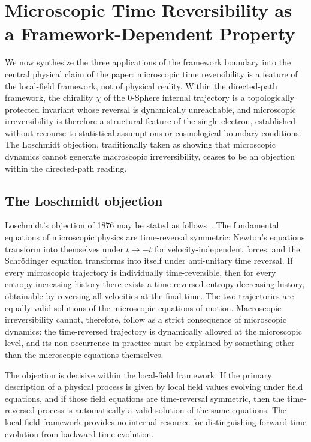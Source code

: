 \documentclass[%
 reprint, amsmath,amssymb, aps, prb, ]{revtex4-2}
\numberwithin{equation}{section}
\begin{document}
\section{Microscopic Time Reversibility as a Framework-Dependent Property}
\label{sec:irreversibility}

We now synthesize the three applications of the framework boundary into the central physical claim of the paper: microscopic time reversibility is a feature of the local-field framework, not of physical reality. Within the directed-path framework, the chirality $\chi$ of the 0-Sphere internal trajectory is a topologically protected invariant whose reversal is dynamically unreachable, and microscopic irreversibility is therefore a structural feature of the single electron, established without recourse to statistical assumptions or cosmological boundary conditions. The Loschmidt objection, traditionally taken as showing that microscopic dynamics cannot generate macroscopic irreversibility, ceases to be an objection within the directed-path reading.

\subsection{The Loschmidt objection}
\label{sec:loschmidt}

Loschmidt's objection of 1876 may be stated as follows~\cite{Loschmidt1876}. The fundamental equations of microscopic physics are time-reversal symmetric: Newton's equations transform into themselves under $t \to -t$ for velocity-independent forces, and the Schr\"odinger equation transforms into itself under anti-unitary time reversal. If every microscopic trajectory is individually time-reversible, then for every entropy-increasing history there exists a time-reversed entropy-decreasing history, obtainable by reversing all velocities at the final time. The two trajectories are equally valid solutions of the microscopic equations of motion. Macroscopic irreversibility cannot, therefore, follow as a strict consequence of microscopic dynamics: the time-reversed trajectory is dynamically allowed at the microscopic level, and its non-occurrence in practice must be explained by something other than the microscopic equations themselves.

The objection is decisive within the local-field framework. If the primary description of a physical process is given by local field values evolving under field equations, and if those field equations are time-reversal symmetric, then the time-reversed process is automatically a valid solution of the same equations. The local-field framework provides no internal resource for distinguishing forward-time evolution from backward-time evolution.
\end{document}
